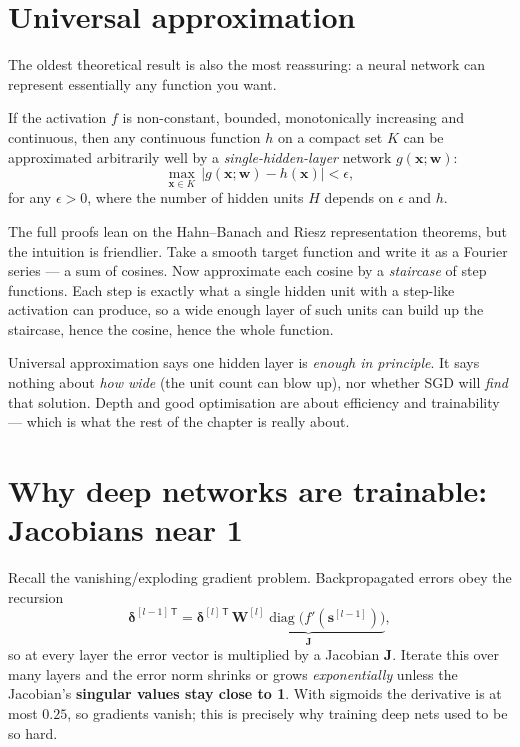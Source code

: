 \documentclass[11pt, oneside]{book}
\newcommand{\diag}{\operatorname{diag}}
\newcommand{\weights}{\mathbf{w}}
\newcommand{\xvec}{\mathbf{x}}
\begin{document}
\section{Universal approximation}

The oldest theoretical result is also the most reassuring: a neural network can
represent essentially any function you want.

\begin{thmbox}[title={Universal approximation (Hornik, Funahashi, 1989)}]
If the activation $f$ is non-constant, bounded, monotonically increasing and
continuous, then any continuous function $h$ on a compact set $K$ can be
approximated arbitrarily well by a \emph{single-hidden-layer} network
$g(\xvec;\weights)$:
\[
  \max_{\xvec\in K}\,\bigl|g(\xvec;\weights) - h(\xvec)\bigr| < \epsilon ,
\]
for any $\epsilon>0$, where the number of hidden units $H$ depends on $\epsilon$
and $h$.
\end{thmbox}

The full proofs lean on the Hahn--Banach and Riesz representation theorems, but the
intuition is friendlier. Take a smooth target function and write it as a Fourier
series --- a sum of cosines. Now approximate each cosine by a \emph{staircase} of
step functions. Each step is exactly what a single hidden unit with a step-like
activation can produce, so a wide enough layer of such units can build up the
staircase, hence the cosine, hence the whole function.

\begin{notebox}[title={What this does and doesn't say}]
Universal approximation says one hidden layer is \emph{enough in principle}. It
says nothing about \emph{how wide} (the unit count can blow up), nor whether SGD
will \emph{find} that solution. Depth and good optimisation are about efficiency
and trainability --- which is what the rest of the chapter is really about.
\end{notebox}

\section{Why deep networks are trainable: Jacobians near 1}

Recall the vanishing/exploding gradient problem. Backpropagated errors obey the
recursion
\[
  \boldsymbol\delta^{[l-1]\,\mathsf{T}}
  = \boldsymbol\delta^{[l]\,\mathsf{T}}\,
    \underbrace{\mathbf{W}^{[l]}\diag\!\bigl(f'(\mathbf{s}^{[l-1]})\bigr)}_{\mathbf{J}},
\]
so at every layer the error vector is multiplied by a Jacobian $\mathbf{J}$. Iterate
this over many layers and the error norm shrinks or grows \emph{exponentially}
unless the Jacobian's \textbf{singular values stay close to 1}. With sigmoids the
derivative is at most $0.25$, so gradients vanish; this is precisely why training
deep nets used to be so hard.
\end{document}
